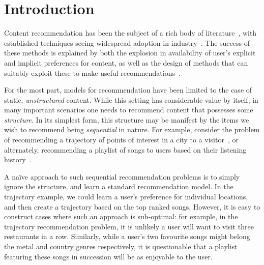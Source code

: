 
\secmoveup
\section{Introduction}
\label{sec:intro}
\textmoveup

Content recommendation has been the subject of a rich body of literature~\citep{Goldberg:1992,Sarwar:2001,Koren:2010},
with established techniques seeing widespread adoption in industry~\citep{Linden:2003,Agarwal:2013,Amatriain:2015,Gomez-Uribe:2015}.
The success of these methods is explained by both the explosion in availability of user's explicit and implicit preferences for content,
as well as the design of methods that can suitably exploit these to make useful recommendations~\citep{Koren:2009}.

For the most part, models for recommendation have been limited to the case of static, \emph{unstructured} content.
While this setting has considerable value by itself,
in many important scenarios one needs to recommend content that possesses some \emph{structure}.
In its simplest form, this structure may be manifest by the items we wish to recommend being \emph{sequential} in nature.
For example, consider the problem of
recommending a trajectory of points of interest in a city to a visitor~\citep{lu2010photo2trip,lu2012personalized,ijcai15,cikm16paper},
or alternately,
recommending a playlist of songs to users based on their listening history~\citep{McFee:2011,chen2012playlist}.

A na\"{i}ve approach to such sequential recommendation problems is to simply ignore the structure,
and learn a standard recommendation model.
In the trajectory example, we could learn a user's preference for individual locations,
and then create a trajectory based on the top ranked songs.
However, it is easy to construct cases where such an approach is sub-optimal:
for example,
in the trajectory recommendation problem, it is unlikely a user will want to visit three restaurants in a row.
Similarly, 
while a user's two favourite songs might belong
the metal and country genres respectively,
it is questionable that a playlist featuring these songs in succession will be as enjoyable to the user.

